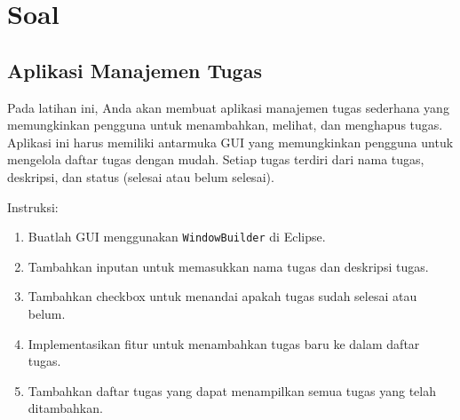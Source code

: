 \section{Soal}

\subsection{Aplikasi Manajemen Tugas}

Pada latihan ini, Anda akan membuat aplikasi manajemen tugas sederhana yang memungkinkan pengguna untuk menambahkan, melihat, dan menghapus tugas. Aplikasi ini harus memiliki antarmuka GUI yang memungkinkan pengguna untuk mengelola daftar tugas dengan mudah. Setiap tugas terdiri dari nama tugas, deskripsi, dan status (selesai atau belum selesai).

Instruksi: 
\begin{enumerate} 
	\item Buatlah GUI menggunakan \texttt{WindowBuilder} di Eclipse. 
	\item Tambahkan inputan untuk memasukkan nama tugas dan deskripsi tugas. 
	\item Tambahkan checkbox untuk menandai apakah tugas sudah selesai atau belum. 
	\item Implementasikan fitur untuk menambahkan tugas baru ke dalam daftar tugas. 
	\item Tambahkan daftar tugas yang dapat menampilkan semua tugas yang telah ditambahkan.
\end{enumerate}
